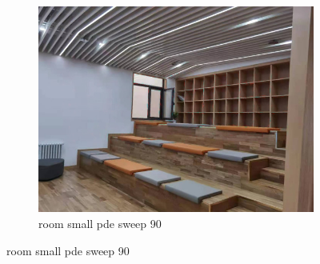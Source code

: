 \documentclass[11pt]{article}
\begin{document}
\begin{figure}[ht!]
\begin{subfigure}[]{0.333\linewidth}
        \centering
        \includegraphics[width=\linewidth]{fig/restoration/room_small/pde_90.jpg}
        \caption{room small pde sweep 90}
    \end{subfigure}%
\end{figure}
\end{document}
